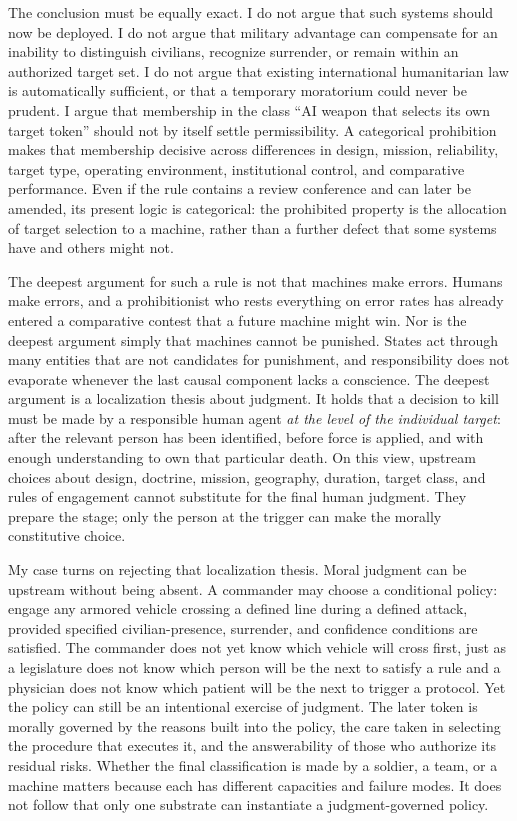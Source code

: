 \documentclass[11pt]{article}
\begin{document}
The conclusion must be equally exact. I do not argue that such systems should now be deployed. I do not argue that military advantage can compensate for an inability to distinguish civilians, recognize surrender, or remain within an authorized target set. I do not argue that existing international humanitarian law is automatically sufficient, or that a temporary moratorium could never be prudent. I argue that membership in the class ``AI weapon that selects its own target token'' should not by itself settle permissibility. A categorical prohibition makes that membership decisive across differences in design, mission, reliability, target type, operating environment, institutional control, and comparative performance. Even if the rule contains a review conference and can later be amended, its present logic is categorical: the prohibited property is the allocation of target selection to a machine, rather than a further defect that some systems have and others might not.

The deepest argument for such a rule is not that machines make errors. Humans make errors, and a prohibitionist who rests everything on error rates has already entered a comparative contest that a future machine might win. Nor is the deepest argument simply that machines cannot be punished. States act through many entities that are not candidates for punishment, and responsibility does not evaporate whenever the last causal component lacks a conscience. The deepest argument is a localization thesis about judgment. It holds that a decision to kill must be made by a responsible human agent \emph{at the level of the individual target}: after the relevant person has been identified, before force is applied, and with enough understanding to own that particular death. On this view, upstream choices about design, doctrine, mission, geography, duration, target class, and rules of engagement cannot substitute for the final human judgment. They prepare the stage; only the person at the trigger can make the morally constitutive choice.

My case turns on rejecting that localization thesis. Moral judgment can be upstream without being absent. A commander may choose a conditional policy: engage any armored vehicle crossing a defined line during a defined attack, provided specified civilian-presence, surrender, and confidence conditions are satisfied. The commander does not yet know which vehicle will cross first, just as a legislature does not know which person will be the next to satisfy a rule and a physician does not know which patient will be the next to trigger a protocol. Yet the policy can still be an intentional exercise of judgment. The later token is morally governed by the reasons built into the policy, the care taken in selecting the procedure that executes it, and the answerability of those who authorize its residual risks. Whether the final classification is made by a soldier, a team, or a machine matters because each has different capacities and failure modes. It does not follow that only one substrate can instantiate a judgment-governed policy.
\end{document}

